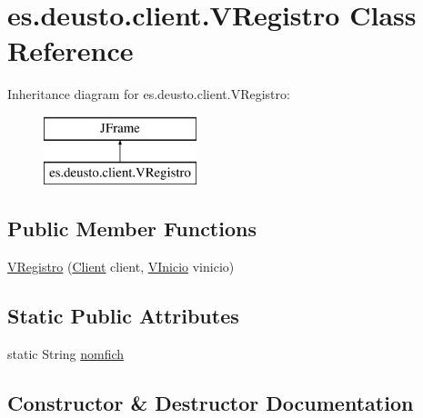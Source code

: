 \hypertarget{classes_1_1deusto_1_1client_1_1_v_registro}{}\section{es.\+deusto.\+client.\+V\+Registro Class Reference}
\label{classes_1_1deusto_1_1client_1_1_v_registro}
Inheritance diagram for es.\+deusto.\+client.\+V\+Registro\+:\begin{figure}[H]
\begin{center}
\leavevmode
\includegraphics[height=2.000000cm]{classes_1_1deusto_1_1client_1_1_v_registro}
\end{center}
\end{figure}
\subsection*{Public Member Functions}
\begin{DoxyCompactItemize}
\item 
\mbox{\hyperlink{classes_1_1deusto_1_1client_1_1_v_registro_a165d85fa11be62dca22063b2892cde7b}{V\+Registro}} (\mbox{\hyperlink{classes_1_1deusto_1_1client_1_1_client}{Client}} client, \mbox{\hyperlink{classes_1_1deusto_1_1client_1_1_v_inicio}{V\+Inicio}} vinicio)
\end{DoxyCompactItemize}
\subsection*{Static Public Attributes}
\begin{DoxyCompactItemize}
\item 
static String \mbox{\hyperlink{classes_1_1deusto_1_1client_1_1_v_registro_aaed4b25a7461d8f707107022b6c9b6e6}{nomfich}}
\end{DoxyCompactItemize}


\subsection{Constructor \& Destructor Documentation}
\mbox{\label{classes_1_1deusto_1_1client_1_1_v_registro_a165d85fa11be62dca22063b2892cde7b}} 
